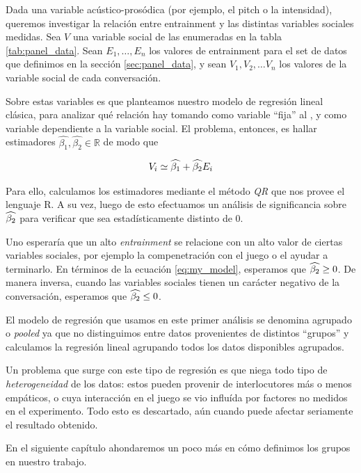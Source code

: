 Dada una variable acústico-prosódica (por ejemplo, el pitch o la intensidad), queremos investigar la relación entre entrainment y las distintas variables sociales medidas. Sea $V$ una variable social de las enumeradas en la tabla \ref{tab:panel_data}. Sean $E_1, \ldots, E_n$ los valores de entrainment para el set de datos que definimos en la sección \ref{sec:panel_data}, y sean $V_1, V_2, \ldots V_n$ los valores de la variable social de cada conversación.

Sobre estas variables es que planteamos nuestro modelo de regresión lineal clásica, para analizar qué relación hay tomando como variable ``fija'' al \entrainment, y como variable dependiente a la variable social. El problema, entonces, es hallar estimadores $\widehat{\beta_1}, \widehat{\beta_2} \in \mathbb{R}$ de modo que

\begin{equation}
  V_i \simeq \widehat{\beta_1} + \widehat{\beta_2} E_i
  \label{eq:my_model}
\end{equation}


Para ello, calculamos los estimadores mediante el método \emph{QR} que nos provee el lenguaje R. A su vez, luego de esto efectuamos un análisis de significancia sobre $\widehat{\beta_2}$ para verificar que sea estadísticamente distinto de 0.

Uno esperaría que un alto \emph{entrainment} se relacione con un alto valor de ciertas variables sociales, por ejemplo la compenetración con el juego o el ayudar a terminarlo. En términos de la ecuación \ref{eq:my_model}, esperamos que $\widehat{\beta_2} \geq 0$. De manera inversa, cuando las variables sociales tienen un carácter negativo de la conversación, esperamos que $\widehat{\beta_2} \leq 0$.


El modelo de regresión que usamos en este primer análisis se denomina agrupado o \emph{pooled} ya que no distinguimos entre datos provenientes de distintos ``grupos'' \cite{gujarati1999} y calculamos la regresión lineal agrupando todos los datos disponibles agrupados.

Un problema que surge con este tipo de regresión es que niega todo tipo de \emph{heterogeneidad} de los datos: estos pueden provenir de interlocutores más o menos empáticos, o cuya interacción en el juego se vio influída por factores no medidos en el experimento. Todo esto es descartado, aún cuando puede afectar seriamente  el resultado obtenido.

En el siguiente capítulo ahondaremos un poco más en cómo definimos los grupos en nuestro trabajo.

